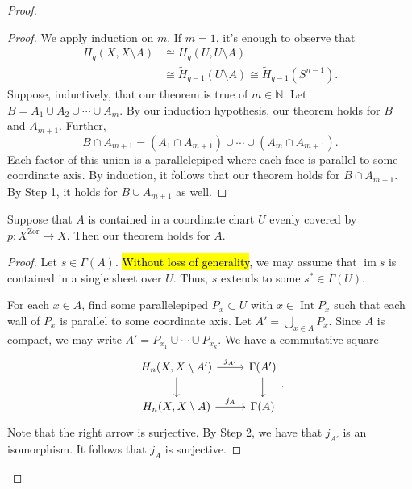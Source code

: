 \documentclass[10pt,letterpaper,cm]{nupset}
\theoremstyle{definition}
\theoremstyle{theorem}
\theoremstyle{remark}
\newcommand{\N}{\mathbb N}
\newcommand{\1}{\mathbb{1}}
\newcommand{\0}{\vec 0}
\DeclareMathOperator{\im}{im}
\DeclareMathOperator{\Int}{Int}
\begin{document}
\begin{proof}
\begin{steps}
\begin{proof}
We apply induction on $m$. If $m=1$, it's enough to observe that
\begin{align*}
H_q(X, X\setminus A) & \cong H_q(U, U\setminus A)
\\ &\cong  \widetilde{H}_{q-1}(U\setminus A) \cong \widetilde{H}_{q-1}(S^{n-1}).
\end{align*} Suppose, inductively, that our theorem is true of $m\in \N$. Let $B= A_1 \cup A_2 \cup \cdots \cup  A_m$. By our induction hypothesis, our theorem holds for $B$ and $A_{m+1}$. Further, $$B \cap A_{m+1} = \left(A_1 \cap A_{m+1}\right) \cup \cdots \cup \left(A_m \cap A_{m+1}\right) .$$ Each factor of this union is a parallelepiped where each face is parallel to some coordinate axis. By induction, it follows that our theorem holds for $B \cap A_{m+1}$. By Step 1, it holds for $B \cup A_{m+1}$ as well.
\end{proof}
\item Suppose that $A$ is contained in a coordinate chart $U$ evenly covered by $p: X^{\mathrm{Zor}} \to X$. Then our theorem holds for $A$.
\begin{proof}
Let $s\in \Gamma(A)$. \hl{Without loss of generality}, we may assume that $\im{s}$ is contained in a single sheet over $U$. Thus, $s$ extends to some $s^{\ast} \in \Gamma(U)$.

For each $x\in A$, find some parallelepiped $P_x \subset U$ with $x\in \Int{P_x}$ such that each wall of $P_x$ is parallel to some coordinate axis. Let $A' = \bigcup_{x\in A}P_x$. Since $A$ is compact, we may write $A' = P_{x_1} \cup \cdots \cup P_{x_k}$. We have a commutative square
\[
\begin{tikzcd}
{H_n(X, X\setminus A')} \arrow[r, "j_{A'}"] \arrow[d] & \Gamma(A') \arrow[d] \\
{H_n(X, X\setminus A)} \arrow[r, "j_A"]               & \Gamma(A)           
\end{tikzcd}
.\] Note that the right arrow is surjective. By Step 2, we have that $j_{A'}$ is an isomorphism. It follows that $j_A$ is surjective.


\end{proof}
\end{steps}
\end{proof}
\end{document}
